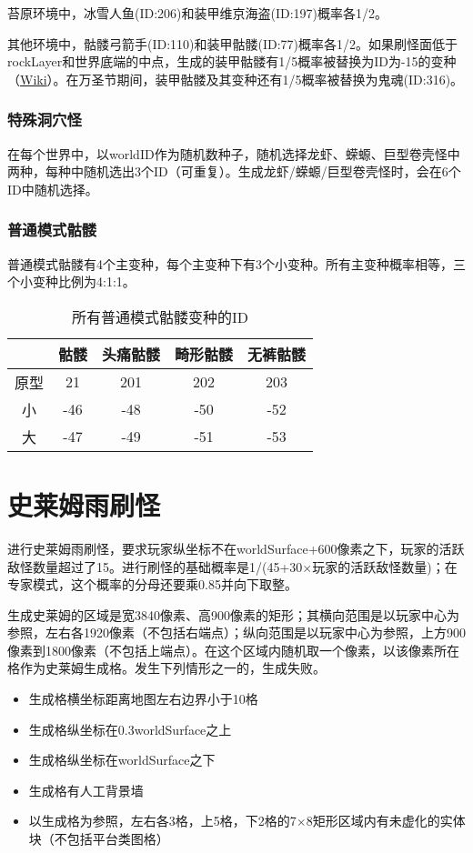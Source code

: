苔原环境中，冰雪人鱼(ID:206)和装甲维京海盗(ID:197)概率各1/2。

其他环境中，骷髅弓箭手(ID:110)和装甲骷髅(ID:77)概率各1/2。如果刷怪面低于rockLayer和世界底端的中点，生成的装甲骷髅有1/5概率被替换为ID为-15的变种（\href{https://terraria-zh.gamepedia.com/装甲骷髅}{Wiki}）。在万圣节期间，装甲骷髅及其变种还有1/5概率被替换为鬼魂(ID:316)。

\subsubsection{特殊洞穴怪}\label{app20}
在每个世界中，以worldID作为随机数种子，随机选择龙虾、蝾螈、巨型卷壳怪中两种，每种中随机选出3个ID（可重复）。生成龙虾/蝾螈/巨型卷壳怪时，会在6个ID中随机选择。

\subsubsection{普通模式骷髅}\label{app21}
普通模式骷髅有4个主变种，每个主变种下有3个小变种。所有主变种概率相等，三个小变种比例为4:1:1。
\begin{table}[!h]
    \centering
    \begin{tabular}{c|cccc}
         &骷髅&头痛骷髅&畸形骷髅&无裤骷髅\\\hline
         原型&21 &201&202&203\\
         小  &-46&-48&-50&-52\\
         大  &-47&-49&-51&-53
    \end{tabular}
    \caption{所有普通模式骷髅变种的ID}
\end{table}

\section{史莱姆雨刷怪}
进行史莱姆雨刷怪，要求玩家纵坐标不在worldSurface+600像素之下，玩家的活跃敌怪数量超过了15。进行刷怪的基础概率是1/(45+30$\times$玩家的活跃敌怪数量)；在专家模式，这个概率的分母还要乘0.85并向下取整。

生成史莱姆的区域是宽3840像素、高900像素的矩形；其横向范围是以玩家中心为参照，左右各1920像素（不包括右端点）；纵向范围是以玩家中心为参照，上方900像素到1800像素（不包括上端点）。在这个区域内随机取一个像素，以该像素所在格作为史莱姆生成格。发生下列情形之一的，生成失败。

\begin{itemize}
    \item 生成格横坐标距离地图左右边界小于10格
    \item 生成格纵坐标在0.3worldSurface之上
    \item 生成格纵坐标在worldSurface之下
    \item 生成格有人工背景墙
    \item 以生成格为参照，左右各3格，上5格，下2格的7$\times$8矩形区域内有未虚化的实体块（不包括平台类图格）
\end{itemize}

